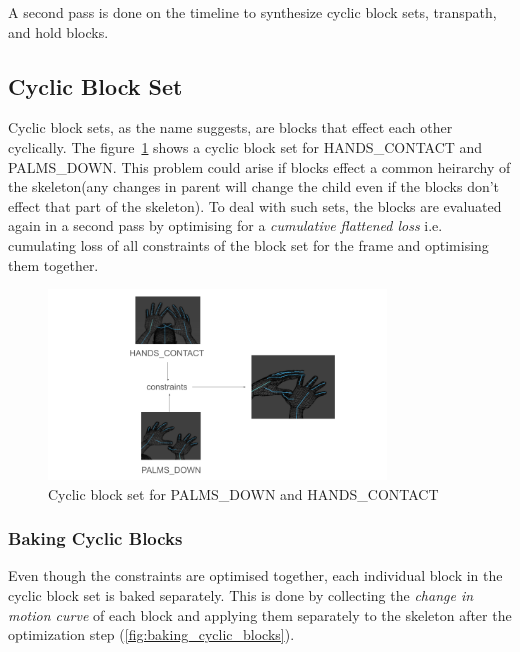 \documentclass[../../main.tex]{subfiles}
\begin{document}
A second pass is done on the timeline to synthesize cyclic block sets, transpath, and hold blocks.

\subsection{Cyclic Block Set}
\label{ch:multi_track:second_pass:cyclic_blocks}

Cyclic block sets, as the name suggests, are blocks that effect each other cyclically. The figure~\ref{fig:cyclic_blocks} shows a cyclic block set for HANDS\_CONTACT and PALMS\_DOWN. This problem could arise if blocks effect a common heirarchy of the skeleton(any changes in parent will change the child even if the blocks don't effect that part of the skeleton). To deal with such sets, the blocks are evaluated again in a second pass by optimising for a \emph{cumulative flattened loss} i.e. cumulating loss of all constraints of the block set for the frame and optimising them together.

\begin{figure}[h]
    \centering
    \includegraphics[width=0.8\textwidth]{chapters/multi_track/images/cyclic_blocks.png}
    \caption{Cyclic block set for PALMS\_DOWN and HANDS\_CONTACT}
    \label{fig:cyclic_blocks}
\end{figure}

\subsubsection{Baking Cyclic Blocks}
\label{ch:multi_track:second_pass:cyclic_blocks:baking_cyclic_blocks}

Even though the constraints are optimised together, each individual block in the cyclic block set is baked separately. This is done by collecting the \emph{change in motion curve} of each block and applying them separately to the skeleton after the optimization step (\ref{fig:baking_cyclic_blocks}).
\end{document}
